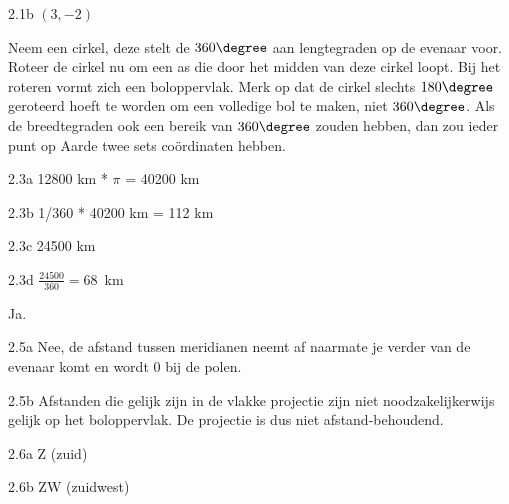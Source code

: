 \begin{Antwoord}{2.1b}
			$(3, -2)$
		
\end{Antwoord}
\begin{Antwoord}{2.2}
		Neem een cirkel, deze stelt de $360\degree$ aan lengtegraden op de evenaar voor. Roteer de cirkel nu om een as die door het midden van deze cirkel loopt. Bij het roteren vormt zich een boloppervlak. Merk op dat de cirkel slechts $180\degree$ geroteerd hoeft te worden om een volledige bol te maken, niet $360\degree$. Als de breedtegraden ook een bereik van $360\degree$ zouden hebben, dan zou ieder punt op Aarde twee sets co\"ordinaten hebben.
	
\end{Antwoord}
\begin{Antwoord}{2.3a}
			12800 km * $\pi$ = 40200 km
		
\end{Antwoord}
\begin{Antwoord}{2.3b}
			1/360 * 40200 km = 112 km
		
\end{Antwoord}
\begin{Antwoord}{2.3c}
			24500 km
		
\end{Antwoord}
\begin{Antwoord}{2.3d}
			$\frac{24500}{360} = 68$~km
		
\end{Antwoord}
\begin{Antwoord}{2.4}
		Ja.
	
\end{Antwoord}
\begin{Antwoord}{2.5a}
			Nee, de afstand tussen meridianen neemt af naarmate je verder van de evenaar komt en wordt 0 bij de polen.
		
\end{Antwoord}
\begin{Antwoord}{2.5b}
			Afstanden die gelijk zijn in de vlakke projectie zijn niet noodzakelijkerwijs gelijk op het boloppervlak. De projectie is dus niet afstand-behoudend.
		
\end{Antwoord}
\begin{Antwoord}{2.6a}
			Z (zuid)
		
\end{Antwoord}
\begin{Antwoord}{2.6b}
			ZW (zuidwest)
		
\end{Antwoord}
